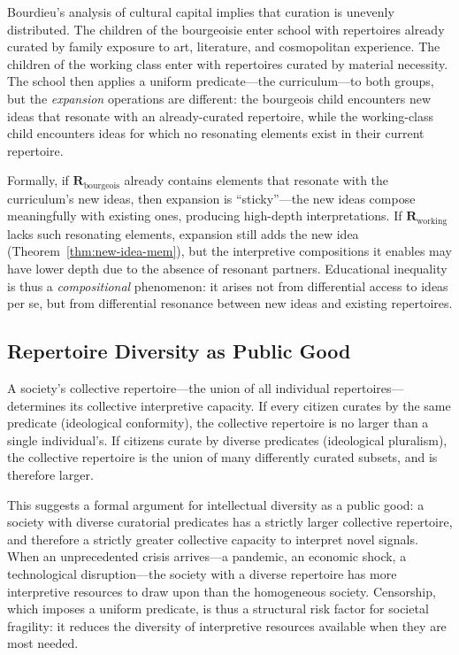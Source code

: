 Bourdieu's analysis of cultural capital implies that curation is
unevenly distributed.  The children of the bourgeoisie enter school
with repertoires already curated by family exposure to art, literature,
and cosmopolitan experience.  The children of the working class enter
with repertoires curated by material necessity.  The school then applies
a uniform predicate---the curriculum---to both groups, but the
\emph{expansion} operations are different: the bourgeois child
encounters new ideas that resonate with an already-curated repertoire,
while the working-class child encounters ideas for which no resonating
elements exist in their current repertoire.

Formally, if $\mathbf{R}_{\text{bourgeois}}$ already contains elements
that resonate with the curriculum's new ideas, then expansion is
``sticky''---the new ideas compose meaningfully with existing ones,
producing high-depth interpretations.  If
$\mathbf{R}_{\text{working}}$ lacks such resonating elements, expansion
still adds the new idea (Theorem~\ref{thm:new-idea-mem}), but the
interpretive compositions it enables may have lower depth due to the
absence of resonant partners.  Educational inequality is thus a
\emph{compositional} phenomenon: it arises not from differential access
to ideas per se, but from differential resonance between new ideas and
existing repertoires.

\subsection{Repertoire Diversity as Public Good}

A society's collective repertoire---the union of all individual
repertoires---determines its collective interpretive capacity.  If every
citizen curates by the same predicate (ideological conformity), the
collective repertoire is no larger than a single individual's.  If
citizens curate by diverse predicates (ideological pluralism), the
collective repertoire is the union of many differently curated subsets,
and is therefore larger.

This suggests a formal argument for intellectual diversity as a public
good: a society with diverse curatorial predicates has a strictly larger
collective repertoire, and therefore a strictly greater collective
capacity to interpret novel signals.  When an unprecedented crisis
arrives---a pandemic, an economic shock, a technological disruption---the
society with a diverse repertoire has more interpretive resources to draw
upon than the homogeneous society.  Censorship, which imposes a uniform
predicate, is thus a structural risk factor for societal fragility:
it reduces the diversity of interpretive resources available when they
are most needed.

